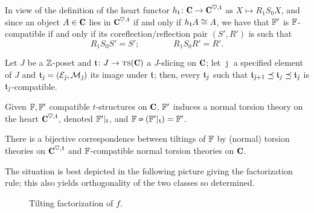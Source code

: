 \documentclass[a4paper,12pt]{amsart}
\begin{document}
In view of the definition of the heart functor $h_\tee\colon \C \to \C^{\heart,\tee}$ as $X\mapsto R_1 S_0 X$, and since an object $A\in\C$ lies in $\C^{\heart,\tee}$ if and only if $h_{\mathfrak{t}} A \cong A$, we have that $\mathbb{F}'$ is $\mathbb{F}$\hyp{}compatible if and only if its coreflection\fshyp{}reflection pair $(S', R')$ is such that 
\[
R_1 S_0 S' = S'; \qquad\qquad R_1 S_0 R'  = R'.
\]
\begin{remark}
Let $J$ be a $\mathbb{Z}$\hyp{}poset and $\tee\colon J\to \ts(\C)$ a $J$\hyp{}slicing on $\C$; let $\bar \jmath$ a specified element of $J$ and $\mathfrak{t}_{\bar\jmath} = (\mathcal{E}_{\bar\jmath}, \mathcal{M}_{\bar\jmath})$ its image under $\mathfrak{t}$; then, every $\mathfrak{t}_j$ such that $\mathfrak{t}_{\bar\jmath+1}\preceq \mathfrak{t}_j \preceq \mathfrak{t}_{\bar\jmath}$ is $\mathfrak{t}_{\bar\jmath}$\hyp{}compatible.
\end{remark}
\begin{proposition}
Given $\mathbb{F}, \mathbb{F}'$ compatible $t$\hyp{}structures on $\C$, $\mathbb{F}'$ induces a normal torsion theory on the heart $\C^{\heart, \tee}$, denoted $\mathbb{F}'|_{\mathfrak{t}}$, and $\fF \tilt (\fF'|_\tee) = \fF'$.
\end{proposition}
\begin{proposition}
There is a bijective correspondence between tiltings of $\mathbb{F}$ by (normal) torsion theories on $\C^{\heart, \tee}$ and $\mathbb{F}$\hyp{}compatible normal torsion theories on $\C$.
\end{proposition}
The situation is best depicted in the following picture giving the factorization rule; this also yields orthogonality of the two classes so determined.
\begin{figure}[h]
\caption{Tilting factorization of $f$.}
\label{tilting.fac}
\end{figure}
\end{document}
